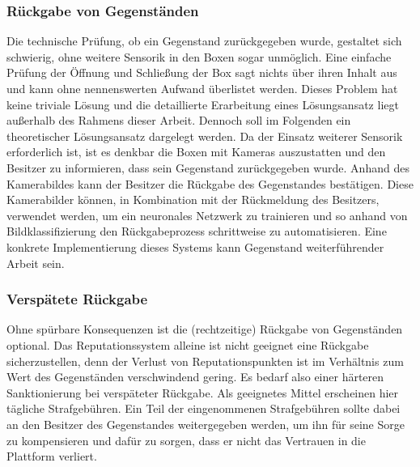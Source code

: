 \documentclass[a4paper]{scrartcl}
\begin{document}
\begin{multicols}{2}
			
			
			\subsubsection{R\"uckgabe von Gegenst\"anden}
				Die technische Pr\"ufung, ob ein Gegenstand zur\"uckgegeben wurde, gestaltet sich schwierig, ohne weitere Sensorik in den Boxen sogar unm\"oglich. Eine einfache Pr\"ufung der \"Offnung und Schlie\ss ung der Box sagt nichts \"uber ihren Inhalt aus und kann ohne nennenswerten Aufwand \"uberlistet werden. Dieses Problem hat keine triviale L\"osung und die detaillierte Erarbeitung eines L\"osungsansatz liegt au\ss erhalb des Rahmens dieser Arbeit. Dennoch soll im Folgenden ein theoretischer L\"osungsansatz dargelegt werden. Da der Einsatz weiterer Sensorik erforderlich ist, ist es denkbar die Boxen mit Kameras auszustatten und den Besitzer zu informieren, dass sein Gegenstand zurückgegeben wurde. Anhand des Kamerabildes kann der Besitzer die Rückgabe des Gegenstandes bestätigen. Diese Kamerabilder können, in Kombination mit der Rückmeldung des Besitzers, verwendet werden, um ein neuronales Netzwerk zu trainieren und so anhand von Bildklassifizierung den Rückgabeprozess schrittweise zu automatisieren. Eine konkrete Implementierung dieses Systems kann Gegenstand weiterf\"uhrender Arbeit sein. 
				
			
			
			\subsubsection{Versp\"atete R\"uckgabe}
				Ohne sp\"urbare Konsequenzen ist die (rechtzeitige) R\"uckgabe von Gegenst\"anden optional. Das Reputationssystem alleine ist nicht geeignet eine R\"uckgabe sicherzustellen, denn der Verlust von Reputationspunkten ist im Verh\"altnis zum Wert des Gegenst\"anden verschwindend gering. Es bedarf also einer h\"arteren Sanktionierung bei versp\"ateter R\"uckgabe. Als geeignetes Mittel erscheinen hier t\"agliche Strafgeb\"uhren. Ein Teil der eingenommenen Strafgeb\"uhren sollte dabei an den Besitzer des Gegenstandes weitergegeben werden, um ihn f\"ur seine Sorge zu kompensieren und daf\"ur zu sorgen, dass er nicht das Vertrauen in die Plattform verliert. 
			
			

\end{multicols}
\end{document}
